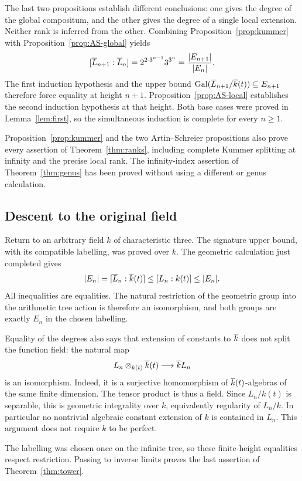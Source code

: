 The last two propositions establish different conclusions: one
gives the degree of the global compositum, and the other gives the
degree of a single local extension. Neither rank is inferred from
the other. Combining Proposition~\ref{prop:kummer} with
Proposition~\ref{prop:AS-global} yields
\[
 [\overline{L}_{n+1}:\overline{L}_n]
   =2^{2\cdot3^{n-1}}3^{3^n}
   =\frac{|E_{n+1}|}{|E_n|}.
\]
The first induction hypothesis and the upper bound
$\operatorname{Gal}(\overline{L}_{n+1}/\overline{k}(t))\subseteq E_{n+1}$ therefore force
equality at height $n+1$. Proposition~\ref{prop:AS-local}
establishes the second induction hypothesis at that height.
Both base cases were proved in Lemma~\ref{lem:first}, so the
simultaneous induction is complete for every $n\geq1$.

Proposition~\ref{prop:kummer} and the two Artin--Schreier
propositions also prove every assertion of
Theorem~\ref{thm:ranks}, including complete Kummer splitting at
infinity and the precise local rank. The infinity-index assertion
of Theorem~\ref{thm:genus} has been proved without using a
different or genus calculation.

\subsection{Descent to the original field}\label{sec:descent}

Return to an arbitrary field $k$ of characteristic three. The
signature upper bound, with its compatible labelling, was proved
over $k$. The geometric calculation just completed gives
\[
 |E_n|=[\overline{L}_n:\overline{k}(t)]
      \leq[L_n:k(t)]\leq|E_n|.
\]
All inequalities are equalities. The natural restriction of the
geometric group into the arithmetic tree action is therefore an
isomorphism, and both groups are exactly $E_n$ in the chosen
labelling.

Equality of the degrees also says that extension of constants to
$\overline{k}$ does not split the function field: the natural map
\[
 L_n\otimes_{k(t)}\overline{k}(t)\longrightarrow\overline{k} L_n
\]
is an isomorphism. Indeed, it is a surjective homomorphism of
$\overline{k}(t)$-algebras of the same finite dimension. The tensor
product is thus a field. Since $L_n/k(t)$ is separable, this is
geometric integrality over $k$, equivalently regularity of
$L_n/k$. In particular no nontrivial algebraic constant extension
of $k$ is contained in $L_n$. This argument does not require $k$
to be perfect.

The labelling was chosen once on the infinite tree, so these
finite-height equalities respect restriction. Passing to inverse
limits proves the last assertion of Theorem~\ref{thm:tower}.

